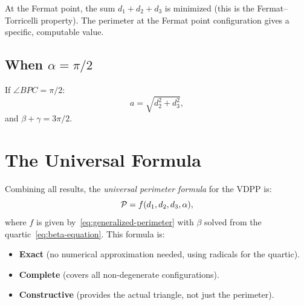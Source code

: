 \begin{remark}
At the Fermat point, the sum $d_1 + d_2 + d_3$ is minimized (this is the Fermat--Torricelli property). The perimeter at the Fermat point configuration gives a specific, computable value.
\end{remark}

\subsection{When $\alpha = \pi/2$}
If $\angle BPC = \pi/2$:
\begin{equation}
a = \sqrt{d_2^2 + d_3^2},
\end{equation}
and $\beta + \gamma = 3\pi/2$.

\section{The Universal Formula}

Combining all results, the \emph{universal perimeter formula} for the VDPP is:
\begin{equation}
\mathcal{P} = f(d_1, d_2, d_3, \alpha),
\end{equation}
where $f$ is given by~\eqref{eq:generalized-perimeter} with $\beta$ solved from the quartic~\eqref{eq:beta-equation}. This formula is:
\begin{itemize}
    \item \textbf{Exact} (no numerical approximation needed, using radicals for the quartic).
    \item \textbf{Complete} (covers all non-degenerate configurations).
    \item \textbf{Constructive} (provides the actual triangle, not just the perimeter).
\end{itemize}
